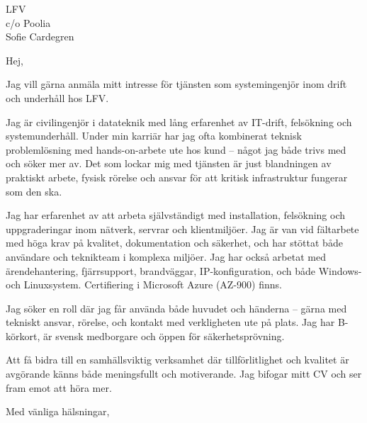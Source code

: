 \documentclass[a4paper,11pt]{letter}
\date{\today}
\begin{document}
\begin{letter}{LFV\\c/o Poolia\\Sofie Cardegren}

\opening{Hej,}

Jag vill gärna anmäla mitt intresse för tjänsten som systemingenjör inom drift och underhåll hos LFV.

Jag är civilingenjör i datateknik med lång erfarenhet av IT-drift, felsökning och systemunderhåll. Under min karriär har jag ofta kombinerat teknisk problemlösning med hands-on-arbete ute hos kund – något jag både trivs med och söker mer av. Det som lockar mig med tjänsten är just blandningen av praktiskt arbete, fysisk rörelse och ansvar för att kritisk infrastruktur fungerar som den ska.

Jag har erfarenhet av att arbeta självständigt med installation, felsökning och uppgraderingar inom nätverk, servrar och klientmiljöer. Jag är van vid fältarbete med höga krav på kvalitet, dokumentation och säkerhet, och har stöttat både användare och teknikteam i komplexa miljöer. Jag har också arbetat med ärendehantering, fjärrsupport, brandväggar, IP-konfiguration, och både Windows- och Linuxsystem. Certifiering i Microsoft Azure (AZ-900) finns.

Jag söker en roll där jag får använda både huvudet och händerna – gärna med tekniskt ansvar, rörelse, och kontakt med verkligheten ute på plats. Jag har B-körkort, är svensk medborgare och öppen för säkerhetsprövning.

Att få bidra till en samhällsviktig verksamhet där tillförlitlighet och kvalitet är avgörande känns både meningsfullt och motiverande. Jag bifogar mitt CV och ser fram emot att höra mer.

\closing{Med vänliga hälsningar,}

\end{letter}
\end{document}
